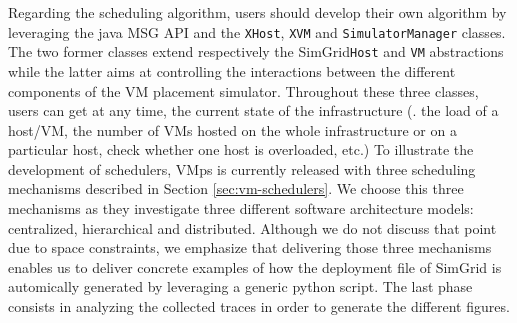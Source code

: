 \documentclass[conference]{IEEEtran}
\newcommand{\sg}{SimGrid\xspace}
\newcommand{\vmps}{VMps\xspace}
\begin{document}
Regarding the scheduling algorithm, users should develop their own
algorithm by leveraging the java MSG API and the \texttt{XHost},
\texttt{XVM} and \texttt{SimulatorManager} classes. The two former
classes extend respectively the \sg \texttt{Host} and \texttt{VM}
abstractions while the latter aims at controlling the interactions
between the different components of the VM placement simulator.
Throughout these three classes, users can get at any time, the current
state of the infrastructure (\ie. the load of a  host/VM,
the number of VMs hosted on the whole infrastructure or on a particular
host, check whether one host is overloaded, etc.) To illustrate the
development of schedulers, \vmps is currently released with
three scheduling mechanisms described in Section
\ref{sec:vm-schedulers}. We choose this three mechanisms as they
investigate three different software architecture models: centralized,
hierarchical and distributed. Although we do not discuss that point
due to space constraints, we emphasize that delivering those three
mechanisms enables us to deliver concrete examples of
how the deployment file of \sg is automically generated by leveraging a
generic python script.
The last phase consists in analyzing the collected traces in order to
generate the different figures.

\end{document}
